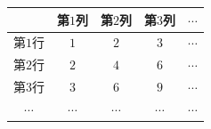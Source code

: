 \begin{tabular}{|c|c|c|c|c|}
\hline
 & 第$1$列 & 第$2$列 & 第$3$列 & $\cdots$ \\
\hline
第$1$行 & $1$ & $2$ & $3$ & $\cdots$ \\
\hline
第$2$行 & $2$ & $4$ & $6$ & $\cdots$ \\
\hline
第$3$行 & $3$ & $6$ & $9$ & $\cdots$ \\
\hline
$\cdots$ & $\cdots$ & $\cdots$ & $\cdots$ & $\cdots$ \\
\hline
\end{tabular}
